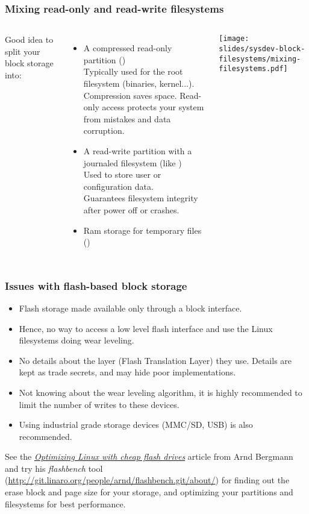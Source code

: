 \begin{frame}
  \frametitle{Mixing read-only and read-write filesystems}
  \begin{columns}
    Good idea to split your block storage into:
    \begin{itemize}
    \item A compressed read-only partition ()\\
      Typically used for the root filesystem (binaries, kernel...).\\
      Compression saves space. Read-only access protects your system
      from mistakes and data corruption.
    \item A read-write partition with a journaled filesystem (like )\\
      Used to store user or configuration data.\\
      Guarantees filesystem integrity after power off or crashes.
    \item Ram storage for temporary files ()
    \end{itemize}
    \texttt{[image: slides/sysdev-block-filesystems/mixing-filesystems.pdf]}
  \end{columns}
\end{frame}

\begin{frame}
  \frametitle{Issues with flash-based block storage}
  \begin{itemize}
  \item Flash storage made available only through a block interface.
  \item Hence, no way to access a low level flash interface
    and use the Linux filesystems doing wear leveling.
  \item No details about the layer (Flash Translation Layer) they
    use. Details are kept as trade secrets, and may hide poor
    implementations.
  \item Not knowing about the wear leveling algorithm, it is highly
    recommended to limit the number of writes to these devices.
  \item Using industrial grade storage devices (MMC/SD, USB) is
    also recommended.
  \end{itemize}
  See the \href{https://lwn.net/Articles/428584/}{\em Optimizing Linux with
  cheap flash drives} article from Arnd Bergmann and try his {\em
  flashbench} tool (\url{http://git.linaro.org/people/arnd/flashbench.git/about/})
  for finding out the erase block and page size for your storage, and
  optimizing your partitions and filesystems for best performance.
\end{frame}

